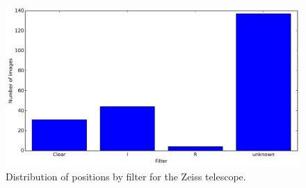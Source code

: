\documentclass[12pt,a4paper]{report}
\begin{document}
\begin{figure}
\includegraphics[width=16.0cm]{filtro_ZEI.png} 
\caption{Distribution of positions by filter for the Zeiss telescope.}
\label{Fig:filtro-ZEI}
\end{figure}
 
\end{document}
